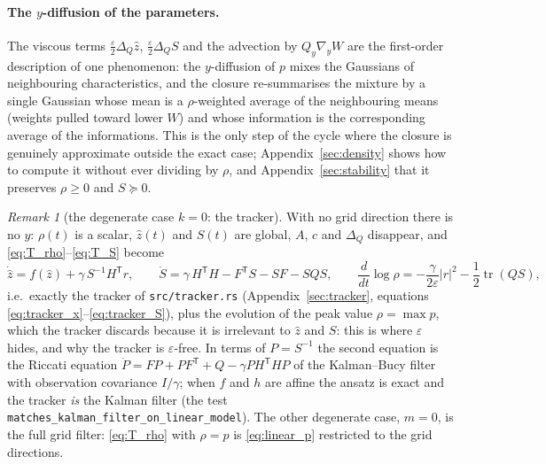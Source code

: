 \documentclass[11pt,a4paper]{article}
\newcommand{\tr}{\operatorname{tr}}
\newcommand{\T}{^{\mathsf T}}
\newcommand{\zh}{\hat{z}}
\newcommand{\eps}{\varepsilon}
\newcommand{\abs}[1]{\left\lvert #1 \right\rvert}
\newcommand{\gy}{\nabla_{\!y}}
\theoremstyle{plain}
\theoremstyle{definition}
\theoremstyle{remark}
\newtheorem{remark}{Remark}
\begin{document}
\paragraph{The $y$-diffusion of the parameters.}
The viscous terms $\tfrac\eps2\Delta_Q\zh$, $\tfrac\eps2\Delta_QS$ and the advection by $Q_y\gy W$ are the first-order description of one phenomenon: the $y$-diffusion of $p$ mixes the Gaussians of neighbouring characteristics, and the closure re-summarises the mixture by a single Gaussian whose mean is a $\rho$-weighted average of the neighbouring means (weights pulled toward lower $W$) and whose information is the corresponding average of the informations. This is the only step of the cycle where the closure is genuinely approximate outside the exact case; Appendix~\ref{sec:density} shows how to compute it without ever dividing by $\rho$, and Appendix~\ref{sec:stability} that it preserves $\rho\ge0$ and $S\succeq0$.

\begin{remark}[the degenerate case $k=0$: the tracker]
With no grid direction there is no $y$: $\rho(t)$ is a scalar, $\zh(t)$ and $S(t)$ are global, $A$, $c$ and $\Delta_Q$ disappear, and \eqref{eq:T_rho}--\eqref{eq:T_S} become
\[
  \dot{\zh} = f(\zh) + \gamma\,S^{-1}H\T r, \qquad
  \dot S = \gamma\,H\T H - F\T S - SF - SQS, \qquad
  \frac{d}{dt}\log\rho = -\frac{\gamma}{2\eps}\abs r^2 - \frac12\tr(QS),
\]
i.e.\ exactly the tracker of \texttt{src/tracker.rs} (Appendix~\ref{sec:tracker}, equations \eqref{eq:tracker_x}--\eqref{eq:tracker_S}), plus the evolution of the peak value $\rho = \max p$, which the tracker discards because it is irrelevant to $\zh$ and $S$: this is where $\eps$ hides, and why the tracker is $\eps$-free. In terms of $P=S^{-1}$ the second equation is the Riccati equation $\dot P = FP+PF\T+Q-\gamma PH\T HP$ of the Kalman--Bucy filter with observation covariance $I/\gamma$; when $f$ and $h$ are affine the ansatz is exact and the tracker \emph{is} the Kalman filter (the test \texttt{matches\_kalman\_filter\_on\_linear\_model}). The other degenerate case, $m=0$, is the full grid filter: \eqref{eq:T_rho} with $\rho=p$ is \eqref{eq:linear_p} restricted to the grid directions.
\end{remark}
\end{document}
